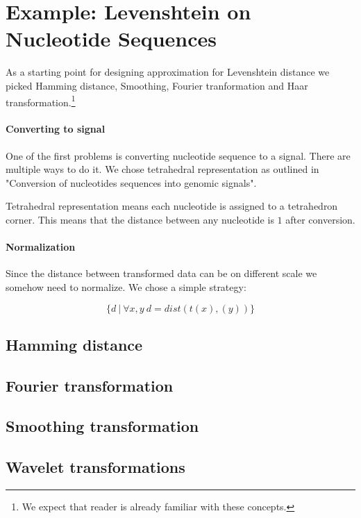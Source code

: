\documentclass [12pt]{article} %
\begin{document}
\section{Example: Levenshtein on Nucleotide Sequences}

As a starting point for designing approximation for Levenshtein distance
we picked Hamming distance, Smoothing, Fourier tranformation and Haar transformation.\footnote{We expect that reader is already familiar with these concepts.}

\paragraph{Converting to signal}

One of the first problems is converting nucleotide sequence to a signal. There are multiple ways to do it. We chose tetrahedral representation as outlined in "Conversion of nucleotides sequences into genomic signals". \cite{cristea2002conversion}

Tetrahedral representation means each nucleotide is assigned to a tetrahedron corner. This means that the distance between any nucleotide is $1$ after conversion.

\paragraph{Normalization}

Since the distance between transformed data can be on different scale we somehow need to normalize. We chose a simple strategy:

$$
\{ d ~ | ~ \forall x,y ~ d = dist(t(x),(y)) \}
$$

\subsection{Hamming distance}

\subsection{Fourier transformation}

\subsection{Smoothing transformation}

\subsection{Wavelet transformations}
\end{document}
